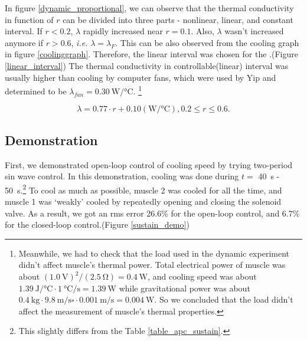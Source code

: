 In figure \ref{dynamic_proportional}, we can observe that the thermal conductivity in function of $r$ can be divided into three parts - nonlinear, linear, and constant interval. If $r<0.2$, $\lambda$ rapidly increased near $r=0.1$. Also, $\lambda$ wasn't increased anymore if $r>0.6$, {\it i.e.} $\lambda = \lambda_{F}$. This can be also observed from the cooling graph in figure \ref{coolinggraph}.
Therefore, the linear interval was chosen for the \Apcnospace.(Figure \ref{linear_interval}) The thermal conductivity in controllable(linear) interval was usually higher than cooling by computer fans, which were used by Yip \etalspace \cite{yip} and determined to be $\lambda_{fan}=\SI{0.30}{\watt\per\degreeCelsius}$.
\footnote{
	Meanwhile, we had to check that the load used in the dynamic experiment didn't affect muscle's thermal power. 
	Total electrical power of muscle was about $(\SI{1.0}{\volt})^2/(\SI{2.5}{\ohm})=\SI{0.4}{\watt}$, and cooling speed was about $\SI{1.39}{\joule\per\degreeCelsius} \cdot \SI{1}{\degreeCelsius\per\second}=\SI{1.39}{\watt}$ while gravitational power was about  $\SI{0.4}{\kilo\gram} \cdot  \SI{9.8}{\meter\per\second\square} \cdot \SI{0.001}{\meter\per\second}=\SI{0.004}{\watt}$. So we concluded that the load didn't affect the measurement of muscle's thermal properties.
}

\begin{equation} \label{lambda_control}
\lambda = 0.77\cdot r + 0.10 (\si{\watt\per\degreeCelsius}), 0.2\leq r \leq 0.6.
\end{equation}



\subsection{\APC Demonstration}



First, we demonstrated open-loop control of cooling speed by trying two-period sin wave control. In this demonstration, cooling was done during $t=$ \SI{40}{\second} - \SI{50}{\second}.\footnote{This slightly differs from the Table \ref{table_apc_sustain}.} To cool as much as possible, muscle 2 was cooled for all the time, and muscle 1 was `weakly' cooled by repeatedly opening and closing the solenoid valve. As a result, we got an rms error 26.6\% for the open-loop control, and 6.7\% for the closed-loop control.(Figure \ref{sustain_demo})

